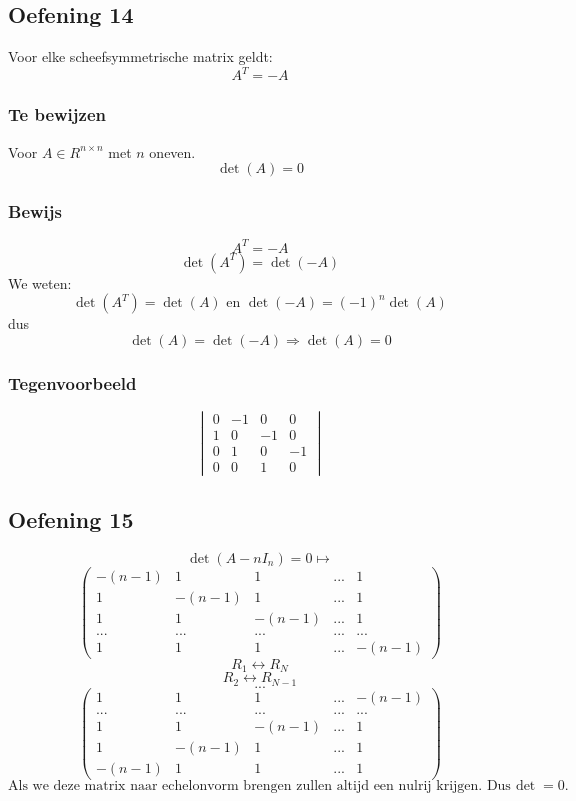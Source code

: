 \documentclass[lineaire_algebra_oplossingen.tex]{subfiles}
\begin{document}
\subsection{Oefening 14}
Voor elke scheefsymmetrische matrix geldt:
\[
A^T= -A
\]
\subsubsection*{Te bewijzen}
Voor $A\in R^{n\times n}$ met $n$ oneven.
\[
\det(A) = 0
\]
\subsubsection*{Bewijs}
\[
A^T = -A
\]
\[
\det(A^T) = \det(-A)
\]
We weten:
\[
\det(A^T) = \det(A) \text{ en } \det(-A) = (-1)^n \det(A)
\]
dus
\[
\det(A) = \det(-A) \Rightarrow \det(A) = 0
\]

\subsubsection*{Tegenvoorbeeld}
\[
\begin{vmatrix}
0 & -1 & 0 & 0\\
1 & 0 & -1 & 0\\
0 & 1 & 0 & -1\\
0 & 0 & 1 & 0
\end{vmatrix}
\]
\subsection{Oefening 15}
\[ \det(A-nI_{n})=0 \longmapsto \]
\[
\begin{pmatrix}
-(n-1) & 1 & 1 &... & 1\\
1 & -(n-1) & 1 & ... & 1\\
1 & 1 & -(n-1) & ... & 1\\
... & ... & ... & ... & ...\\
1 & 1 & 1 & ... & -(n-1)
\end{pmatrix} 
\]
\[R_1 \leftrightarrow R_{N} \]
\[R_2 \leftrightarrow R_{N-1} \]
\[...\]
\[
\begin{pmatrix}
1 & 1 & 1 & ... & -(n-1)\\
... & ... & ... & ... & ...\\
1 & 1 & -(n-1) & ... & 1\\
1 & -(n-1) & 1 & ... & 1\\
-(n-1) & 1 & 1 &... & 1
\end{pmatrix} 
\]
\[ \text{Als we deze matrix naar echelonvorm brengen zullen altijd een nulrij krijgen. Dus $\det=0$.}\]
\end{document}
